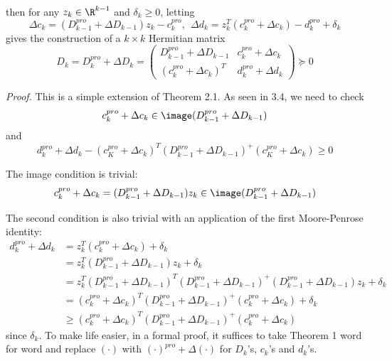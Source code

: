 \documentclass[12pt]{article}
\begin{document}
    
    then for any $z_k \in \R^{k-1}$ and $\delta_k \geq 0$, letting
    \begin{equation}
        \Delta c_k = (D_{k-1}^{pro} + \Delta D_{k-1}) z_k - c_k^{pro}, \ \ \Delta d_k = z_k^T (c_k^{pro} + \Delta c_k) - d_k^{pro} + \delta_k
    \end{equation}
    gives the construction of a $k \times k$ Hermitian matrix
    \begin{equation}
        D_k = D_k^{pro} + \Delta D_k = \begin{pmatrix}
            D_{k-1}^{pro} + \Delta D_{k-1} & c_k^{pro} + \Delta c_k \\
            (c_k^{pro} + \Delta c_k)^T & d_k^{pro} + \Delta d_k
        \end{pmatrix} \succeq 0
    \end{equation}

    \textit{Proof.} This is a simple extension of Theorem 2.1. As seen in 3.4, we need to check 
    \[ c_k^{pro} + \Delta c_k \in \image(D_{k-1}^{pro} + \Delta D_{k-1})\]
    and 
    \[ d_{k}^{pro} + \Delta d_k - (c_K^{pro} + \Delta c_k)^T (D_{k-1}^{pro} + \Delta D_{k-1})^+ (c_K^{pro} + \Delta c_k) \geq 0\]

    The image condition is trivial:
    \[ c_k^{pro} + \Delta c_k = (D_{k-1}^{pro} + \Delta D_{k-1}) z_k  \in \image(D_{k-1}^{pro} + \Delta D_{k-1})\]

    The second condition is also trivial with an application of the first Moore-Penrose identity:
    \begin{align*}
        d_k^{pro} +\Delta d_k &= z_k^T (c_k^{pro} + \Delta c_k) +\delta_k \\
        &=z_k^T (D_{k-1}^{pro} + \Delta D_{k-1}) z_k + \delta_k \\
        &= z_k^T (D_{k-1}^{pro} + \Delta D_{k-1})^T  (D_{k-1}^{pro} + \Delta D_{k-1})^+  (D_{k-1}^{pro} + \Delta D_{k-1}) z_k + \delta_k \\
        &= (c_k^{pro} + \Delta c_k)^T (D_{k-1}^{pro} + \Delta D_{k-1})^+ (c_k^{pro} + \Delta c_k) + \delta_k \\
        &\geq (c_k^{pro} + \Delta c_k)^T (D_{k-1}^{pro} + \Delta D_{k-1})^+ (c_k^{pro} + \Delta c_k)
    \end{align*} 
    since $\delta_k$. To make life easier, in a formal proof, it suffices to take Theorem 1 word for word and replace $(\cdot)$ with $(\cdot)^{pro} + \Delta (\cdot)$ for $D_k$'s, $c_k$'s and $d_k$'s. \\[-6pt]
    
\end{document}
